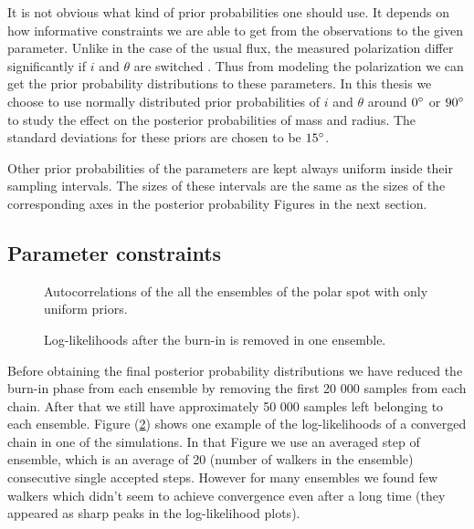 \documentclass{wihuri}
\begin{document}
It is not obvious what kind of prior probabilities one should use. It depends on how informative constraints we are able to get from the observations to the given parameter. Unlike in the case of the usual flux, the measured polarization differ significantly if $i$ and $\theta$ are switched \cite{poutaviironen}. Thus from modeling the polarization we can get the prior probability distributions to these parameters. In this thesis we choose to use normally distributed prior probabilities of $i$ and $\theta$ around $0 \degree$ or $90 \degree$ to study the effect on the posterior probabilities of mass and radius. The standard deviations for these priors are chosen to be $15 \degree$. 

Other prior probabilities of the parameters are kept always uniform inside their sampling intervals. The sizes of these intervals are the same as the sizes of the corresponding axes in the posterior probability Figures in the next section. 



\subsection{Parameter constraints}

\begin{figure}
\centerline{}
\caption{Autocorrelations of the all the ensembles of the polar spot with only uniform priors.
\label{fig:acexample}}
\end{figure}


\begin{figure}
\centerline{}
\caption{Log-likelihoods after the burn-in is removed in one ensemble.
\label{fig:wexample}}
\end{figure}

Before obtaining the final posterior probability distributions we have reduced the burn-in phase from each ensemble by removing the first 20 000 samples from each chain. After that we still have approximately 50 000 samples left belonging to each ensemble.  Figure (\ref{fig:wexample}) shows one example of the log-likelihoods of a converged chain in one of the simulations. In that Figure we use an averaged step of ensemble, which is an average of 20 (number of walkers in the ensemble) consecutive single accepted steps. However for many ensembles we found few walkers which didn't seem to achieve convergence even after a long time (they appeared as sharp peaks in the log-likelihood plots).
\end{document}
